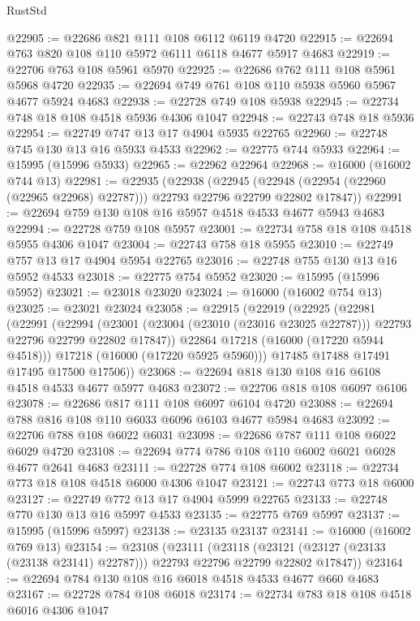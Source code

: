 \begin{lexlean}{RustStd}
\begin{coremodule}
@22905 := @22686 @821 @111 @108 @6112 @6119 @4720
@22915 := @22694 @763 @820 @108 @110 @5972 @6111 @6118 @4677 @5917 @4683
@22919 := @22706 @763 @108 @5961 @5970
@22925 := @22686 @762 @111 @108 @5961 @5968 @4720
@22935 := @22694 @749 @761 @108 @110 @5938 @5960 @5967 @4677 @5924 @4683
@22938 := @22728 @749 @108 @5938
@22945 := @22734 @748 @18 @108 @4518 @5936 @4306 @1047
@22948 := @22743 @748 @18 @5936
@22954 := @22749 @747 @13 @17 @4904 @5935 @22765
@22960 := @22748 @745 @130 @13 @16 @5933 @4533
@22962 := @22775 @744 @5933
@22964 := @15995 (@15996 @5933)
@22965 := @22962 @22964
@22968 := @16000 (@16002 @744 @13)
@22981 := @22935
    (@22938
      (@22945 (@22948 (@22954 (@22960 (@22965 @22968) @22787))) @22793 @22796 @22799 @22802 @17847))
@22991 := @22694 @759 @130 @108 @16 @5957 @4518 @4533 @4677 @5943 @4683
@22994 := @22728 @759 @108 @5957
@23001 := @22734 @758 @18 @108 @4518 @5955 @4306 @1047
@23004 := @22743 @758 @18 @5955
@23010 := @22749 @757 @13 @17 @4904 @5954 @22765
@23016 := @22748 @755 @130 @13 @16 @5952 @4533
@23018 := @22775 @754 @5952
@23020 := @15995 (@15996 @5952)
@23021 := @23018 @23020
@23024 := @16000 (@16002 @754 @13)
@23025 := @23021 @23024
@23058 := @22915
    (@22919
      (@22925
        (@22981
          (@22991
            (@22994
              (@23001 (@23004 (@23010 (@23016 @23025 @22787))) @22793 @22796 @22799 @22802 @17847))
            @22864
            @17218
            (@16000 (@17220 @5944 @4518)))
          @17218
          (@16000 (@17220 @5925 @5960)))
        @17485
        @17488
        @17491
        @17495
        @17500
        @17506))
@23068 := @22694 @818 @130 @108 @16 @6108 @4518 @4533 @4677 @5977 @4683
@23072 := @22706 @818 @108 @6097 @6106
@23078 := @22686 @817 @111 @108 @6097 @6104 @4720
@23088 := @22694 @788 @816 @108 @110 @6033 @6096 @6103 @4677 @5984 @4683
@23092 := @22706 @788 @108 @6022 @6031
@23098 := @22686 @787 @111 @108 @6022 @6029 @4720
@23108 := @22694 @774 @786 @108 @110 @6002 @6021 @6028 @4677 @2641 @4683
@23111 := @22728 @774 @108 @6002
@23118 := @22734 @773 @18 @108 @4518 @6000 @4306 @1047
@23121 := @22743 @773 @18 @6000
@23127 := @22749 @772 @13 @17 @4904 @5999 @22765
@23133 := @22748 @770 @130 @13 @16 @5997 @4533
@23135 := @22775 @769 @5997
@23137 := @15995 (@15996 @5997)
@23138 := @23135 @23137
@23141 := @16000 (@16002 @769 @13)
@23154 := @23108
    (@23111
      (@23118 (@23121 (@23127 (@23133 (@23138 @23141) @22787))) @22793 @22796 @22799 @22802 @17847))
@23164 := @22694 @784 @130 @108 @16 @6018 @4518 @4533 @4677 @660 @4683
@23167 := @22728 @784 @108 @6018
@23174 := @22734 @783 @18 @108 @4518 @6016 @4306 @1047

\end{coremodule}
\end{lexlean}
